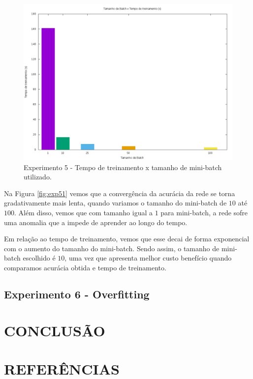 \documentclass[12pt]{article}
\begin{document}
\begin{figure}[h]
  \centering
  \includegraphics[width=1\textwidth]{../tests/5-batch/graph2.png}
  \caption{Experimento 5 - Tempo de treinamento x tamanho de mini-batch
  utilizado.}
  \label{fig:exp52}
\end{figure}

Na Figura \ref{fig:exp51} vemos que a convergência da acurácia da rede
se torna gradativamente mais lenta, quando variamos o tamanho do mini-batch
de $ 10 $ até $ 100 $. Além disso, vemos que com tamanho igual a $ 1 $
para mini-batch, a rede sofre uma anomalia que a impede de aprender ao longo
do tempo.

Em relação ao tempo de treinamento, vemos que esse decai de forma exponencial
com o aumento do tamanho do mini-batch. Sendo assim, o tamanho de mini-batch
escolhido é $ 10 $, uma vez que apresenta melhor custo benefício quando
comparamos acurácia obtida e tempo de treinamento.

\subsection{Experimento 6 - Overfitting}



\section{CONCLUSÃO}



\section{REFERÊNCIAS}



\end{document}
